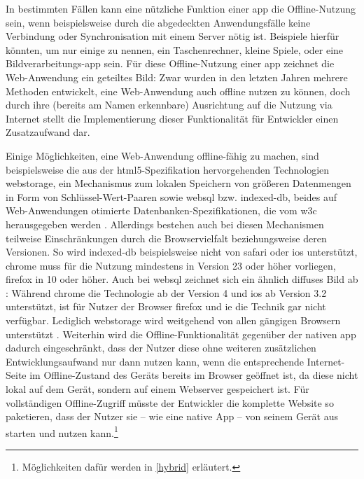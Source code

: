 In bestimmten Fällen kann eine nützliche Funktion einer \gls{app} die Offline-Nutzung sein, wenn beispielsweise durch die abgedeckten Anwendungsfälle keine Verbindung oder Synchronisation mit einem Server nötig ist. Beispiele hierfür könnten, um nur einige zu nennen, ein Taschenrechner, kleine Spiele, oder eine Bildverarbeitungs-\gls{app} sein. 
Für diese Offline-Nutzung einer \gls{app} zeichnet die Web-Anwendung ein geteiltes Bild: Zwar wurden in den letzten Jahren mehrere Methoden entwickelt, eine Web-Anwendung auch offline nutzen zu können, doch durch ihre (bereits am Namen erkennbare) Ausrichtung auf die Nutzung via Internet stellt die Implementierung dieser Funktionalität für Entwickler einen Zusatzaufwand dar. 

Einige Möglichkeiten, eine Web-Anwendung offline-fähig zu machen, sind beispielsweise die aus der \gls{html}5-Spezifikation hervorgehenden Technologien \gls{webstorage}, ein Mechanismus zum lokalen Speichern von größeren Datenmengen in Form von Schlüssel-Wert-Paaren \cite{w3c_webstorage} sowie \gls{websql} bzw. \gls{indexed-db}, beides auf Web-Anwendungen otimierte Datenbanken-Spezifikationen, die vom \gls{w3c} herausgegeben werden \cite{w3c_websql, w3c_indexedDB}.
Allerdings bestehen auch bei diesen Mechanismen teilweise Einschränkungen durch die Browservielfalt beziehungsweise deren Versionen. So wird \gls{indexed-db} beispielsweise nicht von \gls{safari} oder \gls{ios} unterstützt, \gls{chrome} muss für die Nutzung mindestens in Version 23 oder höher vorliegen, \gls{firefox} in 10 oder höher. 
Auch bei \gls{websql} zeichnet sich ein ähnlich diffuses Bild ab : Während \gls{chrome} die Technologie ab der Version 4 und \gls{ios} ab Version 3.2 unterstützt, ist für Nutzer der Browser \gls{firefox} und \gls{ie} die Technik gar nicht verfügbar.
Lediglich \gls{webstorage} wird weitgehend von allen gängigen Browsern unterstützt \cite{html5-rocks_offline}.
Weiterhin wird die Offline-Funktionalität gegenüber der nativen \gls{app} dadurch eingeschränkt, dass der Nutzer diese ohne weiteren zusätzlichen Entwicklungsaufwand nur dann nutzen kann, wenn die entsprechende Internet-Seite im Offline-Zustand des Geräts bereits im Browser geöffnet ist, da diese nicht lokal auf dem Gerät, sondern auf einem Webserver gespeichert ist.
Für vollständigen Offline-Zugriff müsste der Entwickler die komplette Website so paketieren, dass der Nutzer sie -- wie eine native App -- von seinem Gerät aus starten und nutzen kann.\footnote{Möglichkeiten dafür werden in \autoref{hybrid} erläutert.}

